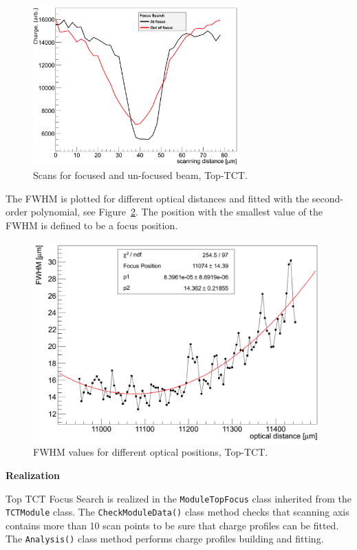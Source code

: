 \documentclass[12pt,oneside,notitlepage,abstracton,a4paper]{scrartcl}
\begin{document}
\begin{figure}[h]
    \centering
    \includegraphics[width=8cm]{pics/top_focus}
    \caption{Scans for focused and un-focused beam, Top-TCT.}
    \label{fig:top_focus_1}
\end{figure} 

The FWHM is plotted for different optical distances and fitted with the second-order polynomial, see Figure~\ref{fig:top_focus_2}. The position with the smallest value of the FWHM is defined to be a focus position.

\begin{figure}[H]
    \centering
    \includegraphics[width=11cm]{pics/top_focus_2}
    \caption{FWHM values for different optical positions, Top-TCT.}
    \label{fig:top_focus_2}
\end{figure}

\textbf{Realization}

\indent Top TCT Focus Search is realized in the \lstinline$ModuleTopFocus$ class inherited from the \lstinline$TCTModule$ class. The \lstinline$CheckModuleData()$ class method checks that scanning axis contains more than 10 scan points to be sure that charge profiles can be fitted. The \lstinline$Analysis()$ class method performs charge profiles building and fitting.
\end{document}
